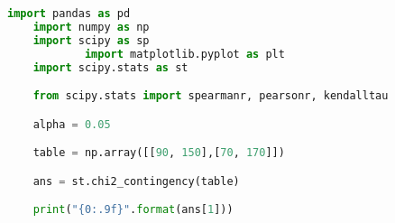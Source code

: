 \documentclass[article,final,14pt]{scrreprt}
\begin{document}
% 

\begin{lstlisting}[language=Python]
	import pandas as pd
	import numpy as np
	import scipy as sp
			import matplotlib.pyplot as plt
	import scipy.stats as st

	from scipy.stats import spearmanr, pearsonr, kendalltau

	alpha = 0.05

	table = np.array([[90, 150],[70, 170]])

	ans = st.chi2_contingency(table)

	print("{0:.9f}".format(ans[1]))
\end{lstlisting}



\end{document}
